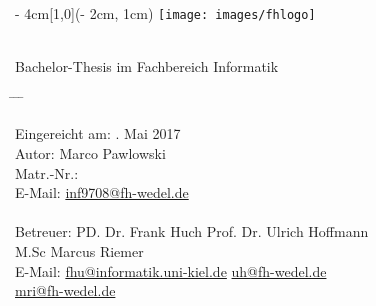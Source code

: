 
\begin{titlepage}
  \vspace*{20ex}
  \begin{textblock*}{\paperwidth - 4cm}[1,0](\paperwidth - 2cm, 1cm)
    \centering
    \texttt{[image: images/fhlogo]}
    \hfill
  \end{textblock*}
  \begin{center}
    \sffamily{}
    {\Large\docsubtitle} \\[4ex]
    {Bachelor-Thesis im Fachbereich Informatik}
  \end{center}
  \vspace*{10ex}
  \begin{tabbing}
    \hspace{8em} \= \hspace{14em} \= \hspace{8em} \= \kill

    Eingereicht am: . Mai 2017 \\[5ex]
    Autor: \> Marco Pawlowski \\
    Matr.-Nr.:  \\
    E-Mail: \> \href{mailto:inf9708@fh-wedel.de}{inf9708@fh-wedel.de} \\

    \\
    Betreuer: \> PD. Dr. Frank Huch  \> Prof. Dr. Ulrich Hoffmann  \\ \> M.Sc Marcus Riemer \\
    E-Mail: \> \href{mailto:fhu@informatik.uni-kiel.de}{fhu@informatik.uni-kiel.de} \> \href{mailto:uh@fh-wedel.de}{uh@fh-wedel.de} \\ \> \href{mailto:mri@fh-wedel.de}{mri@fh-wedel.de}
  \end{tabbing}
  \vfill
\end{titlepage}

\restoregeometry                 %

\cleardoublepage

